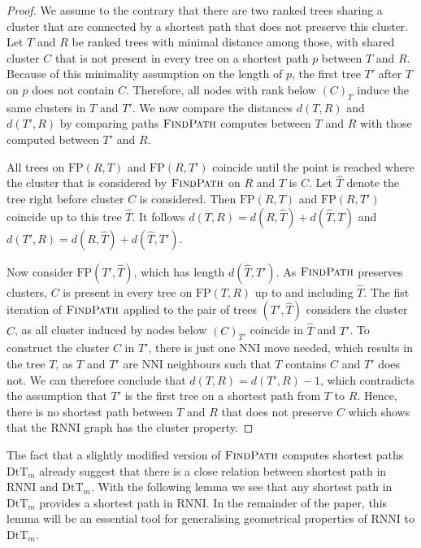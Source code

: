 \documentclass[11pt]{amsart}
\newcommand{\rnni}{\mathrm{RNNI}}
\newcommand{\findpath}{\textsc{FindPath}}
\newcommand{\nni}{\mathrm{NNI}}
\newcommand{\fp}{\mathrm{FP}}
\newcommand{\dtt}{\mathrm{DtT}}
\begin{document}
\begin{proof}
	We assume to the contrary that there are two ranked trees sharing a cluster that are connected by a shortest path that does not preserve this cluster.
	Let $T$ and $R$ be ranked trees with minimal distance among those, with shared cluster $C$ that is not present in every tree on a shortest path $p$ between $T$ and $R$.
	Because of this minimality assumption on the length of $p$, the first tree $T'$ after $T$ on $p$ does not contain $C$.
	Therefore, all nodes with rank below $(C)_T$ induce the same clusters in $T$ and $T'$.
	We now compare the distances $d(T,R)$ and $d(T',R)$ by comparing paths $\findpath$ computes between $T$ and $R$ with those computed between $T'$ and $R$.

	All trees on $\fp(R,T)$ and $\fp(R, T')$ coincide until the point is reached where the cluster that is considered by $\findpath$ on $R$ and $T$ is $C$.
	Let $\hat T$ denote the tree right before cluster $C$ is considered.
	Then $\fp(R,T)$ and $\fp(R,T')$ coincide up to this tree $\hat T$.
	It follows $d(T,R) = d(R,\hat T) + d(\hat T, T)$ and $d(T',R) = d(R,\hat T) + d(\hat T, T')$.

	Now consider $\fp(T', \hat T)$, which has length $d(\hat T, T')$.
	As $\findpath$ preserves clusters, $C$ is present in every tree on $\fp(T,R)$ up to and including $\hat T$.
	The fist iteration of $\findpath$ applied to the pair of trees $(T',\hat T)$ considers the cluster $C$, as all cluster induced by nodes below $(C)_{T'}$ coincide in $\hat T$ and $T'$.
	To construct the cluster $C$ in $T'$, there is just one $\nni$ move needed, which results in the tree $T$, as $T$ and $T'$ are $\nni$ neighbours such that $T$ contains $C$ and $T'$ does not.
	We can therefore conclude that $d(T,R) = d(T',R) - 1$, which contradicts the assumption that $T'$ is the first tree on a shortest path from $T$ to $R$.
	Hence, there is no shortest path between $T$ and $R$ that does not preserve $C$ which shows that the $\rnni$ graph has the cluster property.
\end{proof}

The fact that a slightly modified version of $\findpath$ computes shortest paths $\dtt_m$ already suggest that there is a close relation between shortest path in $\rnni$ and $\dtt_m$.
With the following lemma we see that any shortest path in $\dtt_m$ provides a shortest path in $\rnni$.
In the remainder of the paper, this lemma will be an essential tool for generalising geometrical properties of $\rnni$ to $\dtt_m$.
\end{document}
